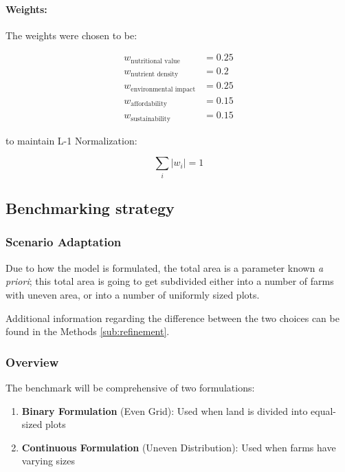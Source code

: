 \documentclass{oqireport}
\begin{document}
\paragraph{Weights:}

The weights were chosen to be:



\begin{align*}
w_{\text{nutritional value}} &= 0.25 \\
w_{\text{nutrient density}} &= 0.2 \\
w_{\text{environmental impact}} &= 0.25 \\
w_{\text{affordability}} &= 0.15 \\
w_{\text{sustainability}} &= 0.15
\end{align*}

to maintain L-1 Normalization:

\begin{equation}
    \sum_i |w_i| =1
\end{equation}



\subsection{Benchmarking strategy}

\subsubsection{Scenario Adaptation}


Due to how the model is  formulated, the total area is a parameter known \textit{a priori}; this total area is going to get subdivided either into a number of farms with uneven area, or into a number of uniformly sized plots.

Additional information regarding the difference between the two choices can be found in the Methods \ref{sub:refinement}.

\subsubsection{Overview}
The benchmark will be comprehensive of two formulations:

\begin{enumerate}
    \item \textbf{Binary Formulation} (Even Grid): Used when land is divided into equal-sized plots
    \item \textbf{Continuous Formulation} (Uneven Distribution): Used when farms have varying sizes
\end{enumerate}
\end{document}
